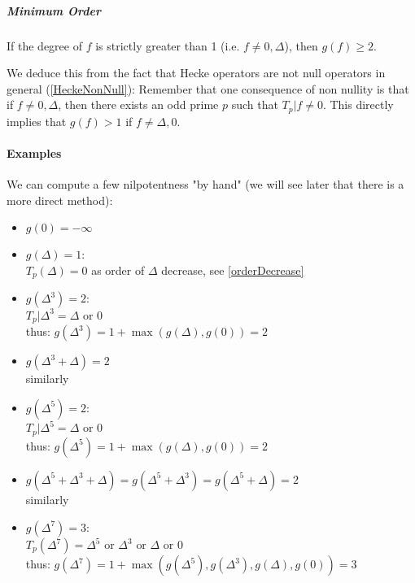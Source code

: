 \subparagraph{Minimum Order}
\label{MinimumOrderNilpotencyHeckeOperators}
If the degree of $f$ is strictly greater than 1 (i.e. $f \neq 0, \Delta$), then $g(f) \geq 2$.

We deduce this from the fact that Hecke operators are not null operators in general (\ref{HeckeNonNull}):
Remember that one consequence of non nullity is that if $f \neq 0, \Delta$, then there exists an odd prime $p$ such that $T_p|f \neq 0$.
This directly implies that $g(f) > 1$ if $f \neq \Delta, 0$.

\paragraph{Examples}
We can compute a few nilpotentness "by hand" (we will see later that there is a more direct method):
\begin{itemize}
	\item $g(0) = -\infty$
	\item $g(\Delta) = 1$:\\
	$ T_p(\Delta) = 0 $
	as order of $\Delta$ decrease, see \ref{orderDecrease}
	\item $g(\Delta^3) = 2$:\\
	$ T_p|\Delta^3 = \Delta \text{ or } 0 $\\
	thus:
	$ g(\Delta^3) = 1 + \max(g(\Delta), g(0)) = 2 $
	\item $g(\Delta^3+\Delta) = 2$\\
	similarly
	\item $g(\Delta^5) = 2$:\\
	$ T_p|\Delta^5 = \Delta \text{ or } 0 $\\
	thus:
	$ g(\Delta^5) = 1 + \max(g(\Delta), g(0)) = 2 $
	\item $g(\Delta^5+\Delta^3+\Delta) = g(\Delta^5+\Delta^3) = g(\Delta^5+\Delta) = 2$\\
	similarly
	\item $g(\Delta^7) = 3$:\\
	$ T_p(\Delta^7) = \Delta^5 \text{ or } \Delta^3 \text{ or }  \Delta \text{ or } 0 $\\
	thus:
	$ g(\Delta^7) = 1 + \max(g(\Delta^5), g(\Delta^3), g(\Delta), g(0)) = 3$
\end{itemize}

